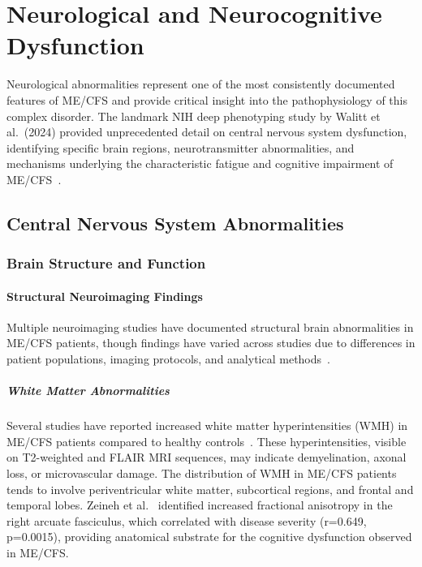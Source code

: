 \chapter{Neurological and Neurocognitive Dysfunction}
\label{ch:neurological}

\label{spec:glial-maturation}
\label{hyp:immune-memory-pruning}

Neurological abnormalities represent one of the most consistently documented features of ME/CFS and provide critical insight into the pathophysiology of this complex disorder. The landmark NIH deep phenotyping study by Walitt et al.\ (2024) provided unprecedented detail on central nervous system dysfunction, identifying specific brain regions, neurotransmitter abnormalities, and mechanisms underlying the characteristic fatigue and cognitive impairment of ME/CFS~\cite{walitt2024deep}.

\section{Central Nervous System Abnormalities}
\label{sec:cns}

\subsection{Brain Structure and Function}

\subsubsection{Structural Neuroimaging Findings}

Multiple neuroimaging studies have documented structural brain abnormalities in ME/CFS patients, though findings have varied across studies due to differences in patient populations, imaging protocols, and analytical methods~\cite{Lee2024neuroimaging}.

\paragraph{White Matter Abnormalities}
Several studies have reported increased white matter hyperintensities (WMH) in ME/CFS patients compared to healthy controls~\cite{Lange1999mri,Zeineh2015white}. These hyperintensities, visible on T2-weighted and FLAIR MRI sequences, may indicate demyelination, axonal loss, or microvascular damage. The distribution of WMH in ME/CFS patients tends to involve periventricular white matter, subcortical regions, and frontal and temporal lobes. Zeineh et al.~\cite{Zeineh2015white} identified increased fractional anisotropy in the right arcuate fasciculus, which correlated with disease severity (r=0.649, p=0.0015), providing anatomical substrate for the cognitive dysfunction observed in ME/CFS.

